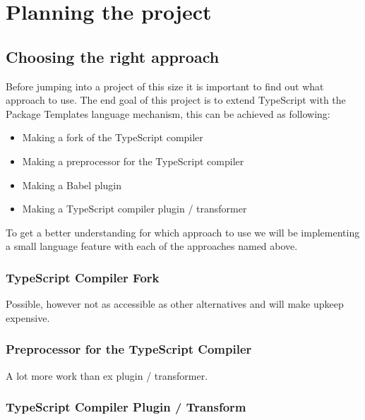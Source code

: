 
\chapter{Planning the project}\label{ch:planning-the-project}



\section{Choosing the right approach}\label{sec:choosing-the-right-approach}

Before jumping into a project of this size it is important to find out what approach to use.
The end goal of this project is to extend TypeScript with the Package Templates language mechanism,
this can be achieved as following:

\begin{itemize}
    \item Making a fork of the TypeScript compiler
    \item Making a preprocessor for the TypeScript compiler
    \item Making a Babel plugin
    \item Making a TypeScript compiler plugin / transformer
\end{itemize}

To get a better understanding for which approach to use we will be implementing a small language feature with each of the approaches named above.

\subsection{TypeScript Compiler Fork}\label{subsec:typescript-compiler-fork}

Possible, however not as accessible as other alternatives and will make upkeep expensive.

\subsection{Preprocessor for the TypeScript Compiler}\label{subsec:preprocessor-for-the-typescript-compiler}

A lot more work than ex plugin / transformer.

\subsection{TypeScript Compiler Plugin / Transform}\label{subsec:typescript-compiler-plugin}

